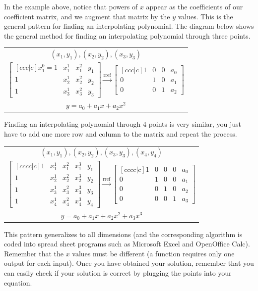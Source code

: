 In the example above, notice that powers of $x$ appear as the coefficients of our coefficient matrix, and we augment that matrix by the $y$ values. This is the general pattern for finding an interpolating polynomial. The diagram below shows the general method for finding an interpolating polynomial through three points.
\begin{center}
\begin{tabular}{c}
$(x_1,y_1),(x_2,y_2),(x_3,y_3)$ \\
 $
\begin{bmatrix}[ccc|c] 
x_1^0=1&x_1^1&x_1^2&y_1\\
1&x_2^1&x_2^2&y_2\\
1&x_3^1&x_3^2&y_3
\end {bmatrix}
\xrightarrow{\text{rref}}
\begin{bmatrix}[ccc|c]
1&0&0&a_0\\
0&1&0&a_1\\
0&0&1&a_2
\end {bmatrix} 
$
\\
 $y=a_0+a_1x+a_2x^2$
\end{tabular}
\end{center}
Finding an interpolating polynomial through 4 points is very similar, you just have to add one more row and column to the matrix and repeat the process.
\begin{center}
\begin{tabular}{c}
$(x_1,y_1),(x_2,y_2),(x_3,y_3),(x_4,y_4)$\\
$
\begin{bmatrix}[cccc|c] 
1&x_1^1&x_1^2&x_1^3&y_1\\
1&x_2^1&x_2^2&x_2^3&y_2\\
1&x_3^1&x_3^2&x_3^3&y_3\\
1&x_4^1&x_4^2&x_4^3&y_4
\end {bmatrix}
\xrightarrow{\text{rref}}
\begin{bmatrix}[cccc|c]
1&0&0&0&a_0\\
0&1&0&0&a_1\\
0&0&1&0&a_2\\
0&0&0&1&a_3
\end {bmatrix} 
$\\
$y=a_0+a_1x+a_2x^2+a_3x^3$
\end{tabular}
\end{center}
This pattern generalizes to all dimensions (and the corresponding algorithm is coded into spread sheet programs such as Microsoft Excel and OpenOffice Calc). Remember that the $x$ values must be different (a function requires only one output for each input). Once you have obtained your solution, remember that you can easily check if your solution is correct by plugging the points into your equation. 





















